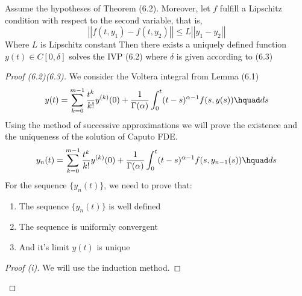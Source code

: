 \begin{theorem}
    Assume the hypotheses of Theorem (6.2). Moreover, let $f$ fulfill a Lipschitz condition with respect to the second variable,
    that is,
    \[
        \left|\left| f(t,y_1)-f(t,y_2) \right|\right| \leq L \left|\left| y_1-y_2 \right|\right|
    \]
    Where $L$ is Lipschitz constant Then there exists a uniquely defined function $y(t) \in C[0, \delta]$ solves the IVP (6.2) where
    $\delta$ is given according to (6.3)
\end{theorem}
\begin{proof}[Proof (6.2)(6.3)]
    We consider the Voltera integral from Lemma (6.1)
    \[
        y(t) = \sum_{k=0}^{m-1} \frac{t^k}{k!} y^{(k)}(0) + \frac{1}{\Gamma(\alpha)} \int_{0}^{t} (t-s)^{\alpha-1}f(s,y(s)) \hquad ds
    \]
    Using the method of successive approximations we will prove the existence and the uniqueness of the solution of Caputo FDE.
    \[
        y_n(t) = \sum_{k=0}^{m-1} \frac{t^k}{k!} y^{(k)}(0) + \frac{1}{\Gamma(\alpha)} \int_{0}^{t} (t-s)^{\alpha-1}f(s,y_{n-1}(s)) \hquad ds
    \]
    For the sequence $\{y_n(t)\}$, we need to prove that:
    \begin{enumerate}[label=\roman*.]
        \item The sequence $\{y_n(t)\}$ is well defined
        \item The sequence is uniformly convergent
        \item And it's limit $y(t)$ is unique
    \end{enumerate}
    \begin{proof}[Proof (i)]
        We will use the induction method. 
        

\end{proof}
\end{proof}
